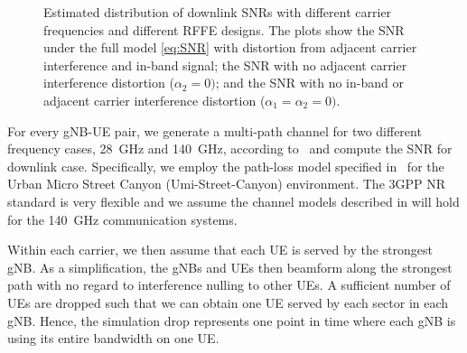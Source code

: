 \begin{figure*}[t]
\centering
    
 \caption{Estimated distribution of downlink SNRs with different carrier frequencies
    and different RFFE designs.  The plots
    show the SNR under the full model
    \eqref{eq:SNR} with distortion from
    adjacent carrier interference and 
    in-band signal; the SNR 
    with no adjacent carrier interference distortion ($\alpha_2=0)$; and
    the SNR with no in-band or
    adjacent carrier interference distortion ($\alpha_1=\alpha_2=0)$.}
  \label{fig:snr_distributions}
\end{figure*}


For every gNB-UE pair, we generate a multi-path channel for two different frequency cases, \SI{28}{GHz} and \SI{140}{GHz},  according to~\cite{3GPP38.901} and compute the SNR for downlink case. 
Specifically, we employ the path-loss model specified in~\cite{3GPP38.901} for the Urban Micro Street Canyon (Umi-Street-Canyon) environment. The 3GPP NR standard is very flexible and we assume the channel models described in
\cite{3GPP38.901} will hold for the \SI{140}{GHz} communication systems.

Within each carrier, we then assume that each UE
is served by the strongest gNB.  As a simplification, 
the gNBs and UEs then beamform
along the strongest path with no regard to
interference nulling to other UEs.  
A sufficient number of UEs are dropped such
that we can obtain one UE served by each
sector in each gNB.  Hence, the simulation
drop represents one point in time where
each gNB is using its entire bandwidth 
on one UE.

